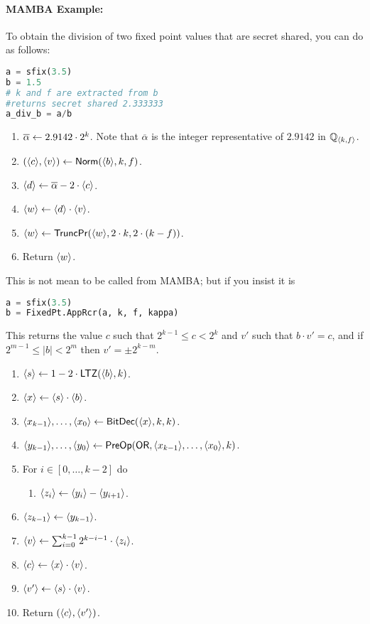   \paragraph{MAMBA Example:} To obtain the division of two fixed point values that are secret shared, you can do as follows:
  \begin{lstlisting}[language={python}]
a = sfix(3.5)
b = 1.5
# k and f are extracted from b
#returns secret shared 2.333333
a_div_b = a/b
\end{lstlisting}

  \begin{enumerate}
    \item $\overline{\alpha} \leftarrow 2.9142 \cdot 2^k$.
          Note that $\overline{\alpha}$ is the integer representative of $2.9142$ in ${\mathbb{Q}}_{\langle k, f \rangle}$.
    \item $(\langle c \rangle,\langle v \rangle) \leftarrow \mathsf{Norm}(\langle b \rangle,k,f)$.
    \item $\langle d \rangle \leftarrow \overline{\alpha} - 2 \cdot \langle c \rangle$.
    \item $\langle w \rangle \leftarrow \langle d \rangle \cdot \langle v \rangle$.
    \item $\langle w \rangle \leftarrow \mathsf{TruncPr}(\langle w \rangle,2 \cdot k,2 \cdot (k-f))$.
    \item Return $\langle w \rangle$.
  \end{enumerate}
  This is not mean to be called from MAMBA; but
  if you insist it is
  \begin{lstlisting}[language={python}]
a = sfix(3.5)
b = FixedPt.AppRcr(a, k, f, kappa)
\end{lstlisting}

  This returns the value $c$ such that $2^{k-1} \le c <2^k$
  and $v'$ such that $b \cdot v' = c$,
  and if $2^{m-1} \le |b| <2^m$ then $v'= \pm 2^{k-m}$.
  \begin{enumerate}
    \item $\langle s \rangle \leftarrow 1-2 \cdot \mathsf{LTZ}(\langle b \rangle,k)$.
    \item $\langle x \rangle \leftarrow \langle s \rangle \cdot \langle b \rangle$.
    \item $\langle x_{k-1} \rangle,\ldots,\langle x_0 \rangle \leftarrow \mathsf{BitDec}(\langle x \rangle,k,k)$.
    \item $\langle y_{k-1} \rangle,\ldots,\langle y_0 \rangle \leftarrow \mathsf{PreOp}(\mathsf{OR},\langle x_{k-1} \rangle,\ldots,\langle x_0 \rangle,k)$.
    \item For $i \in [0,\ldots,k-2]$ do
          \begin{enumerate}
            \item $\langle z_i \rangle \leftarrow \langle y_i \rangle-\langle y_{i+1} \rangle$.
          \end{enumerate}
    \item $\langle z_{k-1} \rangle \leftarrow \langle y_{k-1} \rangle$.
    \item $\langle v \rangle \leftarrow \sum_{i=0}^{k-1} 2^{k-i-1} \cdot \langle z_i \rangle$.
    \item $\langle c \rangle \leftarrow \langle x \rangle \cdot \langle v \rangle$.
    \item $\langle v' \rangle \leftarrow \langle s \rangle \cdot \langle v \rangle$.
    \item Return $(\langle c \rangle, \langle v' \rangle)$.
  \end{enumerate}

